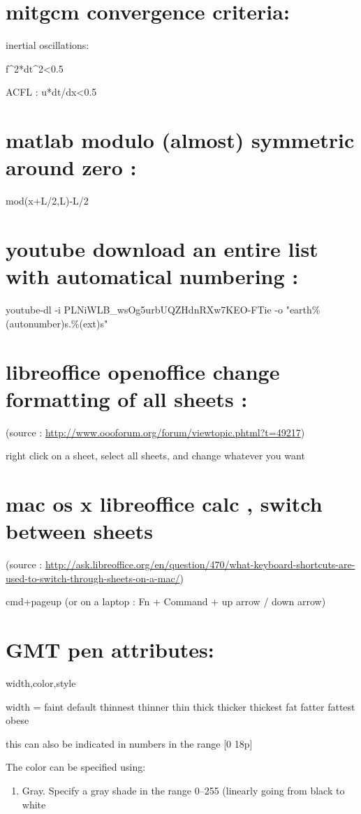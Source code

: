 \documentclass[11pt]{article}
\begin{document}
\section{mitgcm convergence criteria:}
\label{sec-50}
inertial oscillations:

f\^{}2*dt\^{}2<0.5

ACFL :
u*dt/dx<0.5
\section{matlab modulo (almost) symmetric around zero :}
\label{sec-51}

mod(x+L/2,L)-L/2




\section{youtube download an entire list with automatical numbering :}
\label{sec-52}
youtube-dl -i PLNiWLB\_wsOg5urbUQZHdnRXw7KEO-FTie -o "earth\%(autonumber)s.\%(ext)s"

\section{libreoffice openoffice change formatting of all sheets :}
\label{sec-53}
(source : \url{http://www.oooforum.org/forum/viewtopic.phtml?t=49217})

right click on a sheet, select all sheets, and change whatever you want
\section{mac os x libreoffice calc , switch between sheets}
\label{sec-54}
(source  : \url{http://ask.libreoffice.org/en/question/470/what-keyboard-shortcuts-are-used-to-switch-through-sheets-on-a-mac/})

cmd+pageup (or on a laptop : Fn + Command + up arrow / down arrow)

\section{GMT pen attributes:}
\label{sec-55}

width,color,style

width = faint default thinnest thinner thin thick thicker thickest fat fatter fattest obese

this can also be indicated in numbers in the range [0 18p]

The color can be specified using:
\begin{enumerate}
\item Gray. Specify a gray shade in the range 0–255 (linearly going from black \footnotemark[1]{} to white
\end{enumerate}
\end{document}

